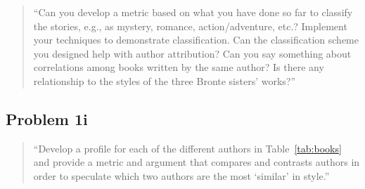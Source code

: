 \documentclass{IEEEtran}
\begin{document}
\begin{quote}
``Can you develop a metric based on what you have done so far to classify the stories, e.g., 
as mystery, romance, action/adventure, etc.? Implement your techniques to demonstrate 
classification. Can the classification scheme you designed help with author attribution? 
Can you say something about correlations among books written by the same author? 
Is there any relationship to the styles of the three Bronte sisters' works?''
\end{quote}

\subsection{Problem 1i}

\begin{quote}
``Develop a profile for each of the different authors in Table~\ref{tab:books} and provide 
a metric and argument that compares and contrasts authors in order to speculate which 
two authors are the most `similar' in style.''
\end{quote}


% 
% 

\appendix

\begin{framed}
\fontsize{5.65}{6.78}\selectfont

\end{framed}
\end{document}
